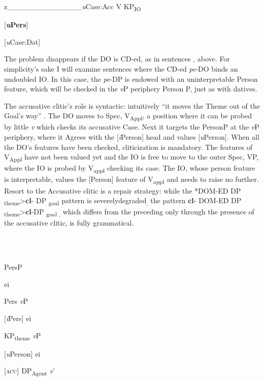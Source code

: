 \documentclass[output=paper,modfonts,nonflat]{langsci/langscibook}
\begin{document}
  z\_\_\_\_\_\_\_\_\_\_\_\_\_\_\textit{u}Case:Acc  V    KP\textsubscript{IO}

              [\textbf{\textit{u}}\textbf{Pers}]

              [\textit{u}Case:Dat]

The problem disappears if the DO is CD-ed, as in sentences ,  above. For simplicity’s sake I will examine sentences where the CD-ed \textit{pe}{}-DO binds an undoubled IO. In this case, the \textit{pe}{}-DP is endowed with an uninterpretable Person feature, which will be checked in the \textit{v}P periphery Person P, just as with datives.

The accusative clitic’s role is syntactic: intuitively “it moves the Theme out of the Goal’s way” \citep{Anagnostopoulou2006}. The DO moves to Spec, V\textsubscript{Appl}, a position where it can be probed by little \textit{v} which checks its accusative Case. Next it targets the PersonP at the \textit{v}P periphery, where it Agrees with the [\textit{i}Person] head and values [\textit{u}Person]. When all the DO’s features have been checked, cliticization is mandatory. The features of V\textsubscript{Appl} have not been valued yet and the IO is free to move to the outer Spec, VP, where the IO is probed by V\textsubscript{appl} checking its case. The IO, whose person feature is interpretable, values the [Person] feature of V\textsubscript{appl} and needs to raise no further. Resort to the Accusative clitic is a repair strategy: while the *DOM-ED DP \textsubscript{theme}>\textbf{cl}{}- DP \textsubscript{goal} pattern is severelydegraded\textsubscript{,} the pattern \textbf{cl}{}- DOM-ED DP \textsubscript{theme}>\textbf{cl}{}-DP \textsubscript{goal ,} which differs from the preceding only through the presence of the accusative clitic, is fully grammatical.

\ea%
    \label{ex:key:41}
    \gll\\
        \\
    \glt
    \z

          

PersP

     ei

Pers    \textit{v}P

[\textit{i}Pers]        ei

  KP\textsubscript{theme}      \textit{v}P

  [\textit{u}Person]   ei

     [\textsc{acc}]  DP\textsubscript{Agent}    \textit{v}’
\end{document}

